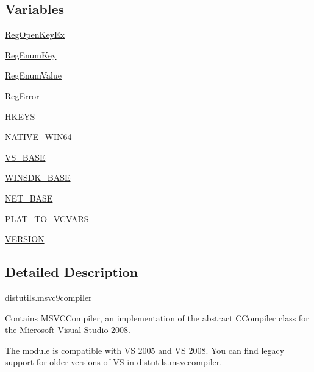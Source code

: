 \subsection*{Variables}
\begin{DoxyCompactItemize}
\item 
\hyperlink{namespacesetuptools_1_1__distutils_1_1msvc9compiler_a6796e5ffe5016f456cb23827ac24d7c0}{Reg\+Open\+Key\+Ex}
\item 
\hyperlink{namespacesetuptools_1_1__distutils_1_1msvc9compiler_af11fb01f580ba66f2a9546f1ff9363b2}{Reg\+Enum\+Key}
\item 
\hyperlink{namespacesetuptools_1_1__distutils_1_1msvc9compiler_a5b8a9d9b12a5d41dbd67eb6154e9e034}{Reg\+Enum\+Value}
\item 
\hyperlink{namespacesetuptools_1_1__distutils_1_1msvc9compiler_ada7c65a5cc7110800ad286016728544b}{Reg\+Error}
\item 
\hyperlink{namespacesetuptools_1_1__distutils_1_1msvc9compiler_aa2883ca6e52126b833ce214719ce1b95}{H\+K\+E\+YS}
\item 
\hyperlink{namespacesetuptools_1_1__distutils_1_1msvc9compiler_a92c32bd84bba334762ba0d4e44339554}{N\+A\+T\+I\+V\+E\+\_\+\+W\+I\+N64}
\item 
\hyperlink{namespacesetuptools_1_1__distutils_1_1msvc9compiler_af8f33a65909edd3b558d823a99e7f3ea}{V\+S\+\_\+\+B\+A\+SE}
\item 
\hyperlink{namespacesetuptools_1_1__distutils_1_1msvc9compiler_a0b52c11dcbea7854f05b2512b85fa90e}{W\+I\+N\+S\+D\+K\+\_\+\+B\+A\+SE}
\item 
\hyperlink{namespacesetuptools_1_1__distutils_1_1msvc9compiler_ad9762ebffd6b1c8d589b688057a4ceed}{N\+E\+T\+\_\+\+B\+A\+SE}
\item 
\hyperlink{namespacesetuptools_1_1__distutils_1_1msvc9compiler_aff38cc20efeaa75ef8bc3597b0bab63f}{P\+L\+A\+T\+\_\+\+T\+O\+\_\+\+V\+C\+V\+A\+RS}
\item 
\hyperlink{namespacesetuptools_1_1__distutils_1_1msvc9compiler_aac2c20fd89c38313646e8bab31002fbe}{V\+E\+R\+S\+I\+ON}
\end{DoxyCompactItemize}


\subsection{Detailed Description}
\begin{DoxyVerb}distutils.msvc9compiler

Contains MSVCCompiler, an implementation of the abstract CCompiler class
for the Microsoft Visual Studio 2008.

The module is compatible with VS 2005 and VS 2008. You can find legacy support
for older versions of VS in distutils.msvccompiler.
\end{DoxyVerb}
 

